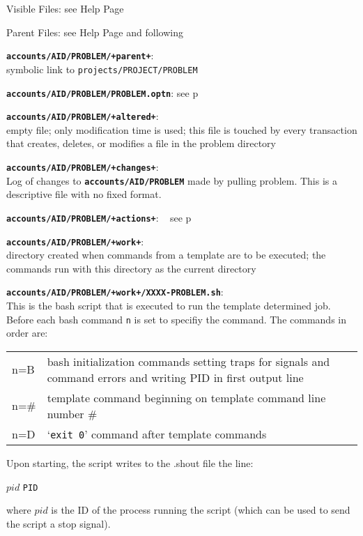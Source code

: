 \documentclass[12pt]{article}
\newenvironment{indpar}[1][0.4in]%
	{\begin{list}{}%
		     {\setlength{\itemsep}{0in}%
		      \setlength{\topsep}{0in}%
		      \setlength{\parsep}{1ex}%
		      \setlength{\labelwidth}{#1}%
		      \setlength{\leftmargin}{#1}%
		      \addtolength{\leftmargin}{\labelsep}}%
	 \item}%
	{\end{list}}
\newenvironment{itemlist}[1][0.2in]%
	{\begin{list}{}{\setlength{\labelwidth}{#1}%
		        \setlength{\leftmargin}{\labelwidth}%
		        \addtolength{\leftmargin}{+0.2in}%
		        \addtolength{\linewidth}{-\labelwidth}%
		        \addtolength{\linewidth}{-0.2in}%
		        \renewcommand{\makelabel}[1]{##1\hfill}}
	 \raggedright}%
	{\end{list}}
\newcommand{\TT}[1]{{\tt \bfseries #1}}
\newcommand{\pagref}[1]{p\pageref{#1}}
\begin{document}
\begin{indpar}
\begin{itemlist}
\item[Visible Files:] see Help Page
\item[Parent Files:] see Help Page and following
\item[\TT{accounts/AID/PROBLEM/+parent+}:]~\\
    symbolic link to {\tt projects/PROJECT/PROBLEM}
\item[\TT{accounts/AID/PROBLEM/PROBLEM.optn}:] see \pagref{PROBLEM.OPTN}
\item[\TT{accounts/AID/PROBLEM/+altered+}:]~
\label{PROBLEM/ALTERED} \\
    empty file; only modification time is used;
    this file is touched by every transaction that
    creates, deletes, or modifies a file in the problem directory
\item[\TT{accounts/AID/PROBLEM/+changes+}:]~
\label{PULL-CHANGES} \\
    Log of changes to \TT{accounts/AID/PROBLEM} made by pulling problem.
    This is a descriptive file with no fixed format.
\item[\TT{accounts/AID/PROBLEM/+actions+}:]~
    see \pagref{ACCOUNT-ACTIONS}
\item[\TT{accounts/AID/PROBLEM/+work+}:]~
\label{PROBLEM/WORK} \\
    directory created when commands from a template are to be
    executed; the commands run with this directory as the current
    directory
\item[\TT{accounts/AID/PROBLEM/+work+/XXXX-PROBLEM.sh}:]~ \\
This is the bash script that is executed to run the template
determined job.  Before each bash command {\tt n} is set to
specifiy the command.  The commands in order are:
\begin{center}
\begin{tabular}{lp{4.0in}}
n=B & bash initialization commands setting traps for signals
      and command errors and writing PID in first output line \\
n=\# & template command beginning on template command line number \# \\
n=D  & `{\tt exit 0}' command after template commands \\
\end{tabular}
\end{center}
Upon starting, the script writes to the .shout file the line:
\begin{center}
$pid$ {\tt PID}
\end{center}
where $pid$ is the ID of the process running the script (which
can be used to send the script a stop signal).


\end{itemlist}
\end{indpar}
\end{document}
